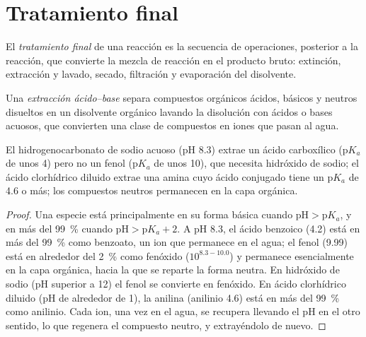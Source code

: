 \section{Tratamiento final}

\begin{definition}\label{def:b2:lab-techniques-2:work-up}
El \emph{tratamiento final} de una reacción es la secuencia de operaciones, posterior a la reacción, que
convierte la mezcla de reacción en el producto bruto: extinción, extracción y lavado, secado,
filtración y evaporación del disolvente.
\end{definition}

\begin{definition}\label{def:b2:lab-techniques-2:acid-base-extraction}
Una \emph{extracción ácido--base} separa compuestos orgánicos ácidos, básicos y neutros
disueltos en un disolvente orgánico lavando la disolución con ácidos o bases acuosos, que
convierten una clase de compuestos en iones que pasan al agua.
\end{definition}

\begin{proposition}\label{prop:b2:lab-techniques-2:acid-base-extraction}
El hidrogenocarbonato de sodio acuoso (pH 8.3) extrae un ácido carboxílico ($\mathrm pK_a$ de unos 4) pero no un
fenol ($\mathrm pK_a$ de unos 10), que necesita hidróxido de sodio; el ácido clorhídrico diluido extrae una
amina cuyo ácido conjugado tiene un $\mathrm pK_a$ de 4.6 o más; los compuestos neutros permanecen en la capa
orgánica.
\end{proposition}

\begin{proof}
Una especie está principalmente en su forma básica cuando $\mathrm{pH} > \mathrm pK_a$, y en más del 99~\% cuando
$\mathrm{pH} > \mathrm pK_a + 2$. A pH 8.3, el ácido benzoico (4.2) está en más del 99~\% como benzoato, un ion
que permanece en el agua; el fenol (9.99) está en alrededor del 2~\% como fenóxido ($10^{8.3 - 10.0}$) y permanece esencialmente
en la capa orgánica, hacia la que se reparte la forma neutra. En hidróxido de sodio (pH superior a 12) el fenol se
convierte en fenóxido. En ácido clorhídrico diluido (pH de alrededor de 1), la anilina (anilinio 4.6) está en más del
99~\% como anilinio. Cada ion, una vez en el agua, se recupera llevando el pH en el otro sentido, lo que
regenera el compuesto neutro, y extrayéndolo de nuevo.
\end{proof}

